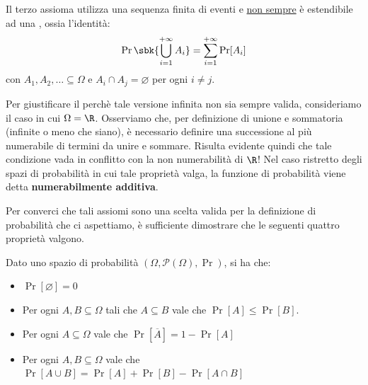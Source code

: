 \documentclass[a4paper, 12pt]{report}
\begin{document}
    Il terzo assioma utilizza una sequenza finita di eventi e \underline{non sempre} è estendibile ad una , ossia l'identità:
    \[\Pr\sbk{\bigcup_{i = 1}^{+\infty} A_i} = \sum_{i = 1}^{+\infty} \Pr[A_i]\]
    con $A_1, A_2, \ldots \subseteq \Omega$ e $A_i \cap A_j = \varnothing$ per ogni $i \neq j$.

    Per giustificare il perchè tale versione infinita non sia sempre valida, consideriamo il caso in cui $\Omega = \R$. Osserviamo che, per definizione di unione e sommatoria (infinite o meno che siano), è necessario definire una successione al più numerabile di termini da unire e sommare. Risulta evidente quindi che tale condizione vada in conflitto con la non numerabilità di $\R$! Nel caso ristretto degli spazi di probabilità in cui tale proprietà valga, la funzione di probabilità viene detta \textbf{numerabilmente additiva}.

    Per converci che tali assiomi sono una scelta valida per la definizione di probabilità che ci aspettiamo, è sufficiente dimostrare che le seguenti quattro proprietà valgono.

    \begin{framedprop}{}
        Dato uno spazio di probabilità $(\Omega, \mathcal{P}(\Omega), \Pr)$, si ha che:
        \begin{itemize}
            \item $\Pr[\varnothing] = 0$
            \item  Per ogni $A,B \subseteq \Omega$ tali che $A \subseteq B$ vale che $\Pr[A] \leq \Pr[B]$.
            \item Per ogni $A \subseteq \Omega$ vale che $\Pr[\overline{A}] = 1- \Pr[A]$
            \item Per ogni $A, B \subseteq \Omega$ vale che $\Pr[A \cup B] = \Pr[A] + \Pr[B] - \Pr[A \cap B]$
        \end{itemize}
    \end{framedprop}
\end{document}
